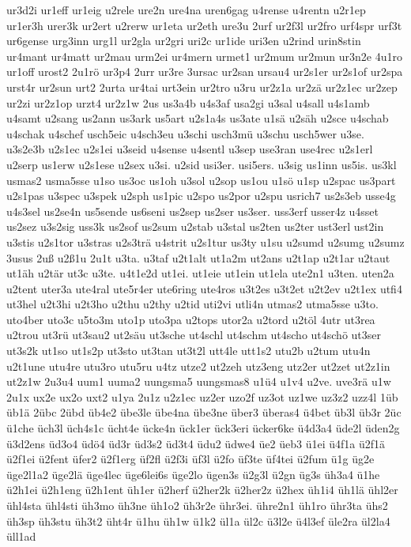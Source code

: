 {ur3d2i
ur1eff
ur1eig
u2rele
ure2n
ure4na
uren6gag
u4rense
u4rentn
u2r1ep
ur1er3h
urer3k
ur2ert
u2rerw
ur1eta
ur2eth
ure3u
2urf
ur2f3l
ur2fro
urf4spr
urf3t
ur6gense
urg3inn
urg1l
ur2gla
ur2gri
uri2c
ur1ide
uri3en
u2rind
urin8stin
ur4mant
ur4matt
ur2mau
urm2ei
ur4mern
urmet1
ur2mum
ur2mun
ur3n2e
4u1ro
ur1off
urost2
2u1rö
ur3p4
2urr
ur3re
3ursac
ur2san
ursau4
ur2s1er
ur2s1of
ur2spa
urst4r
ur2sun
urt2
2urta
ur4tai
urt3ein
ur2tro
u3ru
ur2z1a
ur2zä
ur2z1ec
ur2zep
ur2zi
ur2z1op
urzt4
ur2z1w
2us
us3a4b
u4s3af
usa2gi
u3sal
u4sall
u4s1amb
u4samt
u2sang
us2ann
us3ark
us5art
u2s1a4s
us3ate
u1sä
u2säh
u2sce
u4schab
u4schak
u4schef
usch5eic
u4sch3eu
u3schi
usch3mü
u3schu
usch5wer
u3se.
u3s2e3b
u2s1ec
u2s1ei
u3seid
u4sense
u4sentl
u3sep
use3ran
use4rec
u2s1erl
u2serp
us1erw
u2s1ese
u2sex
u3si.
u2sid
usi3er.
usi5ers.
u3sig
us1inn
us5is.
us3kl
usmas2
usma5sse
u1so
us3oc
us1oh
u3sol
u2sop
us1ou
u1sö
u1sp
u2spac
us3part
u2s1pas
u3spec
u3spek
u2sph
us1pic
u2spo
us2por
u2spu
usrich7
us2s3eb
usse4g
u4s3sel
us2se4n
us5sende
us6seni
us2sep
us2ser
us3ser.
uss3erf
usser4z
u4sset
us2sez
u3s2sig
uss3k
us2sof
us2sum
u2stab
u3stal
us2ten
us2ter
ust3erl
ust2in
u3stis
u2s1tor
u3stras
u2s3trä
u4strit
u2s1tur
us3ty
u1su
u2sumd
u2sumg
u2sumz
3usus
2uß
u2ß1u
2u1t
u3ta.
u3taf
u2t1alt
ut1a2m
ut2ans
u2t1ap
u2t1ar
u2taut
ut1äh
u2tär
ut3c
u3te.
u4t1e2d
ut1ei.
ut1eie
ut1ein
ut1ela
ute2n1
u3ten.
uten2a
u2tent
uter3a
ute4ral
ute5r4er
ute6ring
ute4ros
u3t2es
u3t2et
u2t2ev
u2t1ex
utfi4
ut3hel
u2t3hi
u2t3ho
u2thu
u2thy
u2tid
uti2vi
utli4n
utmas2
utma5sse
u3to.
uto4ber
uto3c
u5to3m
uto1p
uto3pa
u2tops
utor2a
u2tord
u2töl
4utr
ut3rea
u2trou
ut3rü
ut3sau2
ut2säu
ut3sche
ut4schl
ut4schm
ut4scho
ut4schö
ut3ser
ut3s2k
ut1so
ut1s2p
ut3sto
ut3tan
ut3t2l
utt4le
utt1s2
utu2b
u2tum
utu4n
u2t1une
utu4re
utu3ro
utu5ru
u4tz
utze2
ut2zeh
utz3eng
utz2er
ut2zet
ut2z1in
ut2z1w
2u3u4
uum1
uuma2
uungsma5
uungsmas8
u1ü4
u1v4
u2ve.
uve3rä
u1w
2u1x
ux2e
ux2o
uxt2
u1ya
2u1z
u2z1ec
uz2er
uzo2f
uz3ot
uz1we
uz3z2
uzz4l
1üb
üb1ä
2übc
2übd
üb4e2
übe3le
übe4na
übe3ne
über3
überas4
ü4bet
üb3l
üb3r
2üc
ü1che
üch3l
üch4s1c
ücht4e
ücke4n
ück1er
ück3eri
ücker6ke
ü4d3a4
üde2l
üden2g
ü3d2ens
üd3o4
üdö4
üd3r
üd3s2
üd3t4
üdu2
üdwe4
üe2
üeb3
ü1ei
ü4f1a
ü2f1ä
ü2f1ei
ü2fent
üfer2
ü2f1erg
üf2fl
ü2f3i
üf3l
ü2fo
üf3te
üf4tei
ü2fum
ü1g
üg2e
üge2l1a2
üge2lä
üge4lec
üge6lei6s
üge2lo
ügen3s
ü2g3l
ü2gn
üg3s
üh3a4
ü1he
ü2h1ei
ü2h1eng
ü2h1ent
üh1er
ü2herf
ü2her2k
ü2her2z
ü2hex
üh1i4
üh1lä
ühl2er
ühl4sta
ühl4sti
üh3mo
üh3ne
üh1o2
üh3r2e
ühr3ei.
ühre2n1
üh1ro
ühr3ta
ühs2
üh3sp
üh3stu
üh3t2
üht4r
ü1hu
üh1w
ü1k2
ül1a
ül2c
ü3l2e
ü4l3ef
üle2ra
ül2la4
üll1ad
}
